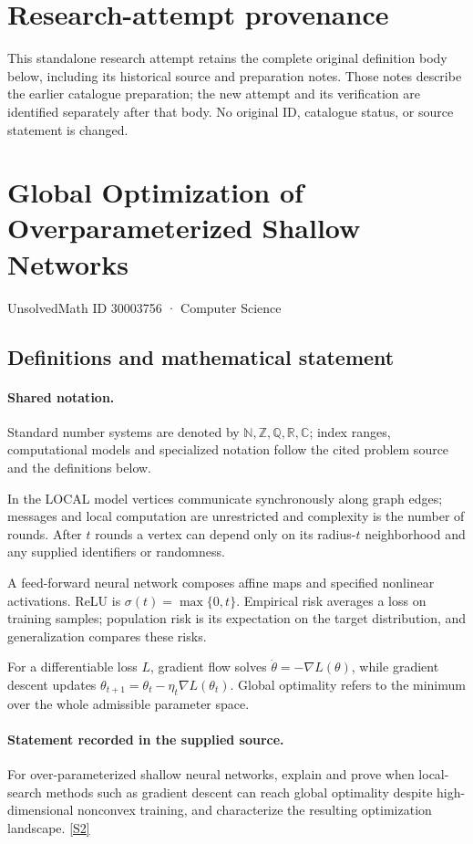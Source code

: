 \documentclass[11pt]{article}
\begin{document}
\section*{Research-attempt provenance}
This standalone research attempt retains the complete original definition body below,
including its historical source and preparation notes. Those notes describe the
earlier catalogue preparation; the new attempt and its verification are identified
separately after that body. No original ID, catalogue status, or source statement is changed.

\section{Global Optimization of Overparameterized Shallow Networks}\label{30003756}
{\small UnsolvedMath ID 30003756 · Computer Science}
\subsection{Definitions and mathematical statement}

\paragraph{Shared notation.}Standard number systems are denoted by $\mathbb N,\mathbb Z,\mathbb Q,\mathbb R,\mathbb C$; index ranges, computational models and specialized notation follow the cited problem source and the definitions below.


In the LOCAL model vertices communicate synchronously along graph edges; messages and local computation are unrestricted and complexity is the number of rounds. After $t$ rounds a vertex can depend only on its radius-$t$ neighborhood and any supplied identifiers or randomness.

A feed-forward neural network composes affine maps and specified nonlinear activations. ReLU is $\sigma(t)=\max\{0,t\}$. Empirical risk averages a loss on training samples; population risk is its expectation on the target distribution, and generalization compares these risks.

For a differentiable loss $L$, gradient flow solves $\dot\theta=-\nabla L(\theta)$, while gradient descent updates $\theta_{t+1}=\theta_t-\eta_t\nabla L(\theta_t)$. Global optimality refers to the minimum over the whole admissible parameter space.
\paragraph{Statement recorded in the supplied source.}
For over-parameterized shallow neural networks, explain and prove when local-search methods such as gradient descent can reach global optimality despite high-dimensional nonconvex training, and characterize the resulting optimization landscape. \href{https://doi.org/10.4171/owr/2018/14}{[S2]}
\end{document}
